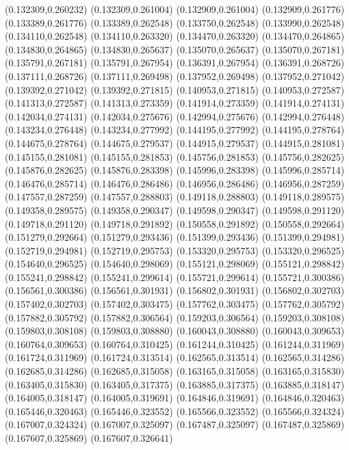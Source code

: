 (0.132309,0.260232)
(0.132309,0.261004)
(0.132909,0.261004)
(0.132909,0.261776)
(0.133389,0.261776)
(0.133389,0.262548)
(0.133750,0.262548)
(0.133990,0.262548)
(0.134110,0.262548)
(0.134110,0.263320)
(0.134470,0.263320)
(0.134470,0.264865)
(0.134830,0.264865)
(0.134830,0.265637)
(0.135070,0.265637)
(0.135070,0.267181)
(0.135791,0.267181)
(0.135791,0.267954)
(0.136391,0.267954)
(0.136391,0.268726)
(0.137111,0.268726)
(0.137111,0.269498)
(0.137952,0.269498)
(0.137952,0.271042)
(0.139392,0.271042)
(0.139392,0.271815)
(0.140953,0.271815)
(0.140953,0.272587)
(0.141313,0.272587)
(0.141313,0.273359)
(0.141914,0.273359)
(0.141914,0.274131)
(0.142034,0.274131)
(0.142034,0.275676)
(0.142994,0.275676)
(0.142994,0.276448)
(0.143234,0.276448)
(0.143234,0.277992)
(0.144195,0.277992)
(0.144195,0.278764)
(0.144675,0.278764)
(0.144675,0.279537)
(0.144915,0.279537)
(0.144915,0.281081)
(0.145155,0.281081)
(0.145155,0.281853)
(0.145756,0.281853)
(0.145756,0.282625)
(0.145876,0.282625)
(0.145876,0.283398)
(0.145996,0.283398)
(0.145996,0.285714)
(0.146476,0.285714)
(0.146476,0.286486)
(0.146956,0.286486)
(0.146956,0.287259)
(0.147557,0.287259)
(0.147557,0.288803)
(0.149118,0.288803)
(0.149118,0.289575)
(0.149358,0.289575)
(0.149358,0.290347)
(0.149598,0.290347)
(0.149598,0.291120)
(0.149718,0.291120)
(0.149718,0.291892)
(0.150558,0.291892)
(0.150558,0.292664)
(0.151279,0.292664)
(0.151279,0.293436)
(0.151399,0.293436)
(0.151399,0.294981)
(0.152719,0.294981)
(0.152719,0.295753)
(0.153320,0.295753)
(0.153320,0.296525)
(0.154640,0.296525)
(0.154640,0.298069)
(0.155121,0.298069)
(0.155121,0.298842)
(0.155241,0.298842)
(0.155241,0.299614)
(0.155721,0.299614)
(0.155721,0.300386)
(0.156561,0.300386)
(0.156561,0.301931)
(0.156802,0.301931)
(0.156802,0.302703)
(0.157402,0.302703)
(0.157402,0.303475)
(0.157762,0.303475)
(0.157762,0.305792)
(0.157882,0.305792)
(0.157882,0.306564)
(0.159203,0.306564)
(0.159203,0.308108)
(0.159803,0.308108)
(0.159803,0.308880)
(0.160043,0.308880)
(0.160043,0.309653)
(0.160764,0.309653)
(0.160764,0.310425)
(0.161244,0.310425)
(0.161244,0.311969)
(0.161724,0.311969)
(0.161724,0.313514)
(0.162565,0.313514)
(0.162565,0.314286)
(0.162685,0.314286)
(0.162685,0.315058)
(0.163165,0.315058)
(0.163165,0.315830)
(0.163405,0.315830)
(0.163405,0.317375)
(0.163885,0.317375)
(0.163885,0.318147)
(0.164005,0.318147)
(0.164005,0.319691)
(0.164846,0.319691)
(0.164846,0.320463)
(0.165446,0.320463)
(0.165446,0.323552)
(0.165566,0.323552)
(0.165566,0.324324)
(0.167007,0.324324)
(0.167007,0.325097)
(0.167487,0.325097)
(0.167487,0.325869)
(0.167607,0.325869)
(0.167607,0.326641)
